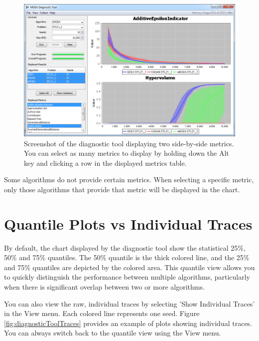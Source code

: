 \begin{figure}
  \includegraphics[width=\linewidth]{diagnosticToolMultiselect.png}
  \caption{Screenshot of the diagnostic tool displaying two side-by-side metrics.  You can select as many metrics to display by holding down the Alt key and clicking a row in the displayed metrics table.}
  \label{fig:diagnosticToolMultiselect}
\end{figure}

\begin{tip}
  Some algorithms do not provide certain metrics.  When selecting a specific metric, only those algorithms that provide that metric will be displayed in the chart.
\end{tip}

\section{Quantile Plots vs Individual Traces}
By default, the chart displayed by the diagnostic tool show the statistical 25\%, 50\% and 75\% quantiles.  The 50\% quantile is the thick colored line, and the 25\% and 75\% quantiles are depicted by the colored area.  This quantile view allows you to quickly distinguish the performance between multiple algorithms, particularly when there is significant overlap between two or more algorithms.

You can also view the raw, individual traces by selecting 'Show Individual Traces' in the View menu.  Each colored line represents one seed.  Figure \ref{fig:diagnosticToolTraces} provides an example of plots showing individual traces.  You can always switch back to the quantile view using the View menu.

